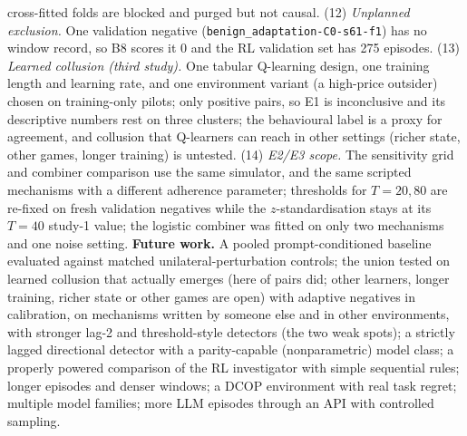 \documentclass[11pt]{article}
\begin{document}
cross-fitted folds are blocked and purged but not causal. (12) \emph{Unplanned exclusion.} One validation negative (\texttt{benign\_adaptation-C0-s61-f1}) has no window record, so B8 scores it 0 and the RL validation set has 275 episodes. (13) \emph{Learned collusion (third study).} One tabular Q-learning design, one training length and learning rate, and one environment variant (a high-price outsider) chosen on training-only pilots; only \fPosPairs{} positive pairs, so E1 is inconclusive and its descriptive numbers rest on three clusters; the behavioural label is a proxy for agreement, and collusion that Q-learners can reach in other settings (richer state, other games, longer training) is untested. (14) \emph{E2/E3 scope.} The sensitivity grid and combiner comparison use the same simulator, and the same scripted mechanisms with a different adherence parameter; thresholds for $T{=}20,80$ are re-fixed on fresh validation negatives while the $z$-standardisation stays at its $T{=}40$ study-1 value; the logistic combiner was fitted on only two mechanisms and one noise setting.
\textbf{Future work.} A pooled prompt-conditioned baseline evaluated against matched unilateral-perturbation controls; the union tested on learned collusion that actually emerges (here \fPosPairs{} of \fJointPairs{} pairs did; other learners, longer training, richer state or other games are open) with adaptive negatives in calibration, on mechanisms written by someone else and in other environments, with stronger lag-2 and threshold-style detectors (the two weak spots); a strictly lagged directional detector with a parity-capable (nonparametric) model class; a properly powered comparison of the RL investigator with simple sequential rules; longer episodes and denser windows; a DCOP environment with real task regret; multiple model families; more LLM episodes through an API with controlled sampling.
\end{document}
